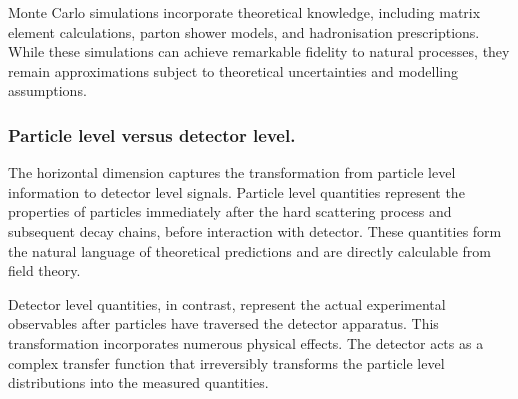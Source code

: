         Monte Carlo simulations incorporate theoretical knowledge, including matrix element calculations, parton shower models, and hadronisation prescriptions.
        While these simulations can achieve remarkable fidelity to natural processes, they remain approximations subject to theoretical uncertainties and modelling assumptions.

    \subsubsection{Particle level versus detector level.}
        The horizontal dimension captures the transformation from particle level information to detector level signals.
        Particle level quantities represent the properties of particles immediately after the hard scattering process and subsequent decay chains, before interaction with detector.
        These quantities form the natural language of theoretical predictions and are directly calculable from field theory.

        Detector level quantities, in contrast, represent the actual experimental observables after particles have traversed the detector apparatus.
        This transformation incorporates numerous physical effects.
        The detector acts as a complex transfer function that irreversibly transforms the particle level distributions into the measured quantities.


